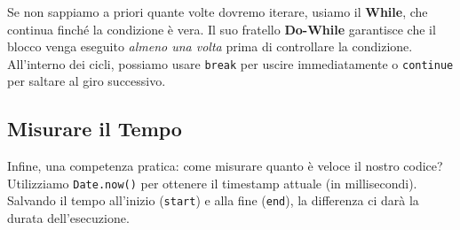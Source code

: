 Se non sappiamo a priori quante volte dovremo iterare, usiamo il \textbf{While}, che continua finché la condizione è vera. Il suo fratello \textbf{Do-While} garantisce che il blocco venga eseguito \textit{almeno una volta} prima di controllare la condizione.
All'interno dei cicli, possiamo usare \texttt{break} per uscire immediatamente o \texttt{continue} per saltare al giro successivo.

\subsection{Misurare il Tempo}
Infine, una competenza pratica: come misurare quanto è veloce il nostro codice? Utilizziamo \texttt{Date.now()} per ottenere il timestamp attuale (in millisecondi). Salvando il tempo all'inizio (\texttt{start}) e alla fine (\texttt{end}), la differenza ci darà la durata dell'esecuzione.
